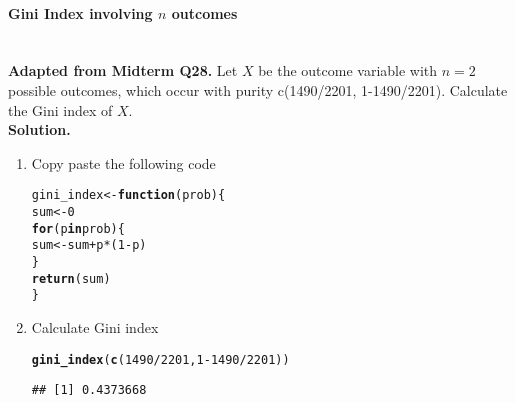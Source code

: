 \documentclass[../../dsa1101_notes.Rtex]{subfiles}\usepackage[]{graphicx}\usepackage[]{color}
\makeatletter
\newcommand{\hlnum}[1]{\textcolor[rgb]{0.686,0.059,0.569}{#1}}%
\newcommand{\hlopt}[1]{\textcolor[rgb]{0,0,0}{#1}}%
\newcommand{\hlstd}[1]{\textcolor[rgb]{0.345,0.345,0.345}{#1}}%
\newcommand{\hlkwa}[1]{\textcolor[rgb]{0.161,0.373,0.58}{\textbf{#1}}}%
\newcommand{\hlkwb}[1]{\textcolor[rgb]{0.69,0.353,0.396}{#1}}%
\newcommand{\hlkwc}[1]{\textcolor[rgb]{0.333,0.667,0.333}{#1}}%
\newcommand{\hlkwd}[1]{\textcolor[rgb]{0.737,0.353,0.396}{\textbf{#1}}}%
\newenvironment{kframe}{%
 \def\at@end@of@kframe{}%
 \ifinner\ifhmode%
  \def\at@end@of@kframe{\end{minipage}}%
  \begin{minipage}{\columnwidth}%
 \fi\fi%
 \def\FrameCommand##1{\hskip\@totalleftmargin \hskip-\fboxsep
 \colorbox{shadecolor}{##1}\hskip-\fboxsep
     \hskip-\linewidth \hskip-\@totalleftmargin \hskip\columnwidth}%
 \MakeFramed {\advance\hsize-\width
   \@totalleftmargin\z@ \linewidth\hsize
   \@setminipage}}%
 {\par\unskip\endMakeFramed%
 \at@end@of@kframe}
\newenvironment{knitrout}{}{} %
\makeatother
\begin{document}
\paragraph{Gini Index involving $n$ outcomes}\mbox{}\\
\textbf{Adapted from Midterm Q28.} Let \(X\) be the outcome variable with \(n=2\) possible outcomes, which occur with purity c(1490/2201, 1-1490/2201). Calculate the Gini index of \(X\).\\
\textbf{Solution.}
\begin{enumerate}
  \item Copy paste the following code
\begin{knitrout}
\color{fgcolor}\begin{kframe}
\begin{alltt}
\hlstd{gini_index} \hlkwb{<-} \hlkwa{function}\hlstd{(}\hlkwc{prob}\hlstd{) \{}
  \hlstd{sum} \hlkwb{<-} \hlnum{0}
  \hlkwa{for} \hlstd{(p} \hlkwa{in} \hlstd{prob) \{}
    \hlstd{sum} \hlkwb{<-} \hlstd{sum} \hlopt{+} \hlstd{p} \hlopt{*} \hlstd{(}\hlnum{1}\hlopt{-}\hlstd{p)}
  \hlstd{\}}
  \hlkwd{return} \hlstd{(sum)}
\hlstd{\}}
\end{alltt}
\end{kframe}
\end{knitrout}
\item Calculate Gini index
\begin{knitrout}
\color{fgcolor}\begin{kframe}
\begin{alltt}
\hlkwd{gini_index}\hlstd{(}\hlkwd{c}\hlstd{(}\hlnum{1490}\hlopt{/}\hlnum{2201}\hlstd{,} \hlnum{1}\hlopt{-}\hlnum{1490}\hlopt{/}\hlnum{2201}\hlstd{))}
\end{alltt}
\begin{verbatim}
## [1] 0.4373668
\end{verbatim}
\end{kframe}
\end{knitrout}
\end{enumerate}
\end{document}
